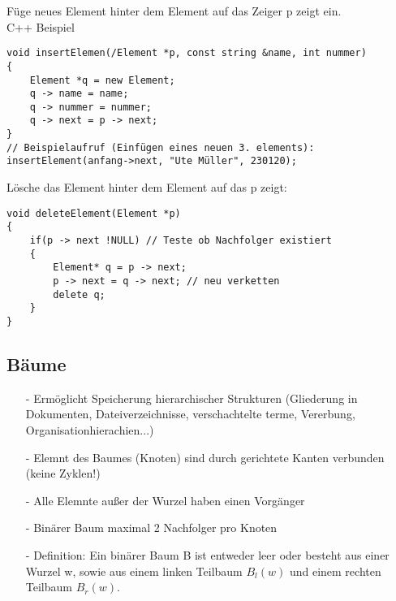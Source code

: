 Füge neues Element hinter dem Element auf das Zeiger p zeigt ein. \\
C++ Beispiel
\begin{lstlisting}
void insertElemen(/Element *p, const string &name, int nummer)
{
    Element *q = new Element;
    q -> name = name;
    q -> nummer = nummer;
    q -> next = p -> next;
}
// Beispielaufruf (Einfügen eines neuen 3. elements):
insertElement(anfang->next, "Ute Müller", 230120);
\end{lstlisting}
Lösche das Element hinter dem Element auf das p zeigt:
\begin{lstlisting}
void deleteElement(Element *p)
{
    if(p -> next !NULL) // Teste ob Nachfolger existiert
    {
        Element* q = p -> next;
        p -> next = q -> next; // neu verketten
        delete q;
    }
}
\end{lstlisting}
\subsection{Bäume}
\begin{itemize}
\item[-] Ermöglicht Speicherung hierarchischer Strukturen (Gliederung in Dokumenten, Dateiverzeichnisse, verschachtelte terme, Vererbung, Organisationhierachien...)
\item[-] Elemnt des Baumes (Knoten) sind durch gerichtete Kanten verbunden (keine Zyklen!)
\item[-] Alle Elemnte außer der Wurzel haben einen Vorgänger
\item[-] Binärer Baum maximal 2 Nachfolger pro Knoten
\item[-] Definition: Ein binärer Baum B ist entweder leer oder besteht aus einer Wurzel w, sowie aus einem linken Teilbaum $B_l(w)$ und einem rechten Teilbaum $B_r(w)$.
\end{itemize}
